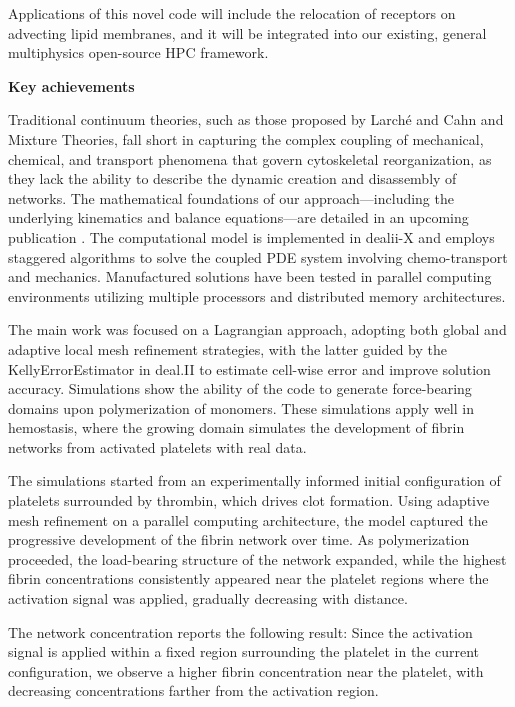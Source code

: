 \documentclass[a4paper,12pt, numbers]{article}
\begin{document}
Applications of this novel code will include the relocation of receptors on advecting lipid membranes, and it will be integrated into our existing, general multiphysics open-source HPC framework.

\noindent\textbf{Key achievements}

Traditional continuum theories, such as those proposed by Larché and Cahn and Mixture Theories, fall short in capturing the complex coupling of mechanical, chemical, and transport phenomena that govern cytoskeletal reorganization, as they lack the ability to describe the dynamic creation and disassembly of networks. The mathematical foundations of our approach—including the underlying kinematics and balance equations—are detailed in an upcoming publication \citep{salvadori2025chemo}. The computational model is implemented in dealii-X and employs staggered algorithms to solve the coupled PDE system involving chemo-transport and mechanics. Manufactured solutions have been tested in parallel computing environments utilizing multiple processors and distributed memory architectures.

The main work was focused on a Lagrangian approach, adopting both global and adaptive local mesh refinement strategies, with the latter guided by the KellyErrorEstimator in deal.II to estimate cell-wise error and improve solution accuracy. Simulations show the ability of the code to generate force-bearing domains upon polymerization of monomers. These simulations apply well in hemostasis, where the growing domain simulates the development of fibrin networks from activated platelets with real data.

The simulations started from an experimentally informed initial configuration of platelets surrounded by thrombin, which drives clot formation. Using adaptive mesh refinement on a parallel computing architecture, the model captured the progressive development of the fibrin network over time. As polymerization proceeded, the load-bearing structure of the network expanded, while the highest fibrin concentrations consistently appeared near the platelet regions where the activation signal was applied, gradually decreasing with distance.

The network concentration reports the following result: Since the activation signal is applied within a fixed region surrounding the platelet in the current configuration, we observe a higher fibrin concentration near the platelet, with decreasing concentrations farther from the activation region.
\end{document}
